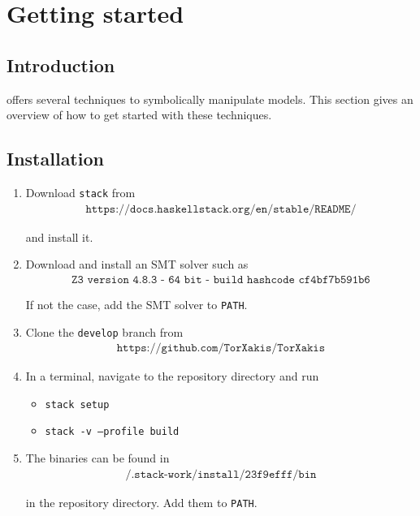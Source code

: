 \chapter{Getting started}

\section{Introduction}

\txs{} offers several techniques to symbolically manipulate \txs{} models.
This section gives an overview of how to get started with these techniques.

\section{Installation}

\begin{enumerate}
\item Download \texttt{stack} from
\begin{align*}
\texttt{https://docs.haskellstack.org/en/stable/README/}
\end{align*}

and install it.

\item Download and install an SMT solver such as
\begin{align*}
\texttt{Z3 version 4.8.3 - 64 bit - build hashcode cf4bf7b591b6}
\end{align*}

If not the case, add the SMT solver to \texttt{PATH}.
\item Clone the \texttt{develop} branch from
\begin{align*}
\texttt{https://github.com/TorXakis/TorXakis}
\end{align*}
\item In a terminal, navigate to the repository directory and run
\begin{itemize}
\item \texttt{stack setup}
\item \texttt{stack -v --profile build}
\end{itemize}
\item The \txs{} binaries can be found in
\begin{align*}
\texttt{/.stack-work/install/23f9efff/bin}
\end{align*}

in the repository directory.
Add them to \texttt{PATH}.
\end{enumerate}

